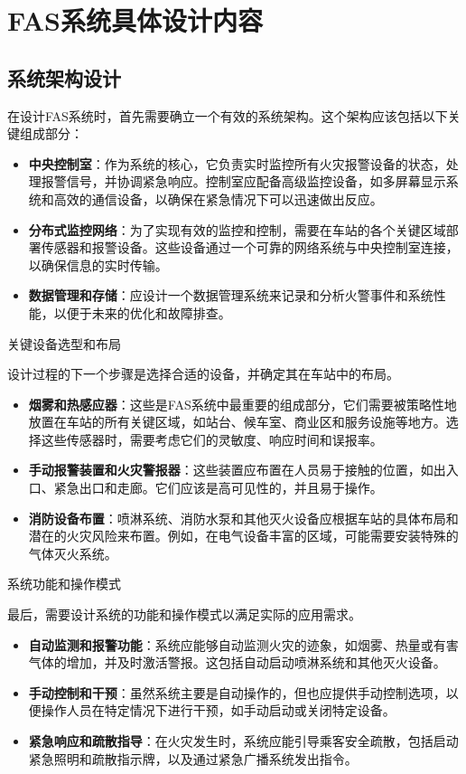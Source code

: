 \chapter{FAS系统具体设计内容}
\section{系统架构设计}
在设计FAS系统时，首先需要确立一个有效的系统架构。这个架构应该包括以下关键组成部分：

\begin{itemize}
	\item \textbf{中央控制室}：作为系统的核心，它负责实时监控所有火灾报警设备的状态，处理报警信号，并协调紧急响应。控制室应配备高级监控设备，如多屏幕显示系统和高效的通信设备，以确保在紧急情况下可以迅速做出反应。
	\item \textbf{分布式监控网络}：为了实现有效的监控和控制，需要在车站的各个关键区域部署传感器和报警设备。这些设备通过一个可靠的网络系统与中央控制室连接，以确保信息的实时传输。
	\item \textbf{数据管理和存储}：应设计一个数据管理系统来记录和分析火警事件和系统性能，以便于未来的优化和故障排查。
\end{itemize}

关键设备选型和布局

设计过程的下一个步骤是选择合适的设备，并确定其在车站中的布局。

\begin{itemize}
	\item \textbf{烟雾和热感应器}：这些是FAS系统中最重要的组成部分，它们需要被策略性地放置在车站的所有关键区域，如站台、候车室、商业区和服务设施等地方。选择这些传感器时，需要考虑它们的灵敏度、响应时间和误报率。
	\item \textbf{手动报警装置和火灾警报器}：这些装置应布置在人员易于接触的位置，如出入口、紧急出口和走廊。它们应该是高可见性的，并且易于操作。
	\item \textbf{消防设备布置}：喷淋系统、消防水泵和其他灭火设备应根据车站的具体布局和潜在的火灾风险来布置。例如，在电气设备丰富的区域，可能需要安装特殊的气体灭火系统。
\end{itemize}

系统功能和操作模式

最后，需要设计系统的功能和操作模式以满足实际的应用需求。

\begin{itemize}
	\item \textbf{自动监测和报警功能}：系统应能够自动监测火灾的迹象，如烟雾、热量或有害气体的增加，并及时激活警报。这包括自动启动喷淋系统和其他灭火设备。
	\item \textbf{手动控制和干预}：虽然系统主要是自动操作的，但也应提供手动控制选项，以便操作人员在特定情况下进行干预，如手动启动或关闭特定设备。
	\item \textbf{紧急响应和疏散指导}：在火灾发生时，系统应能引导乘客安全疏散，包括启动紧急照明和疏散指示牌，以及通过紧急广播系统发出指令。
\end{itemize}

